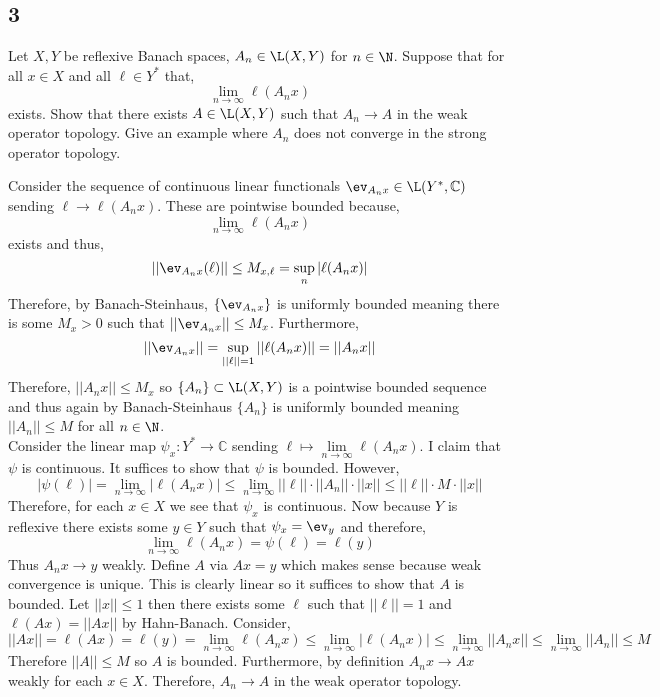 \documentclass[12pt]{article}
\renewcommand{\C}{\mathbb{C}}
\begin{document}
\subsection{3}

\begin{exercise}
Let $X, Y$ be reflexive Banach spaces, $A_n \in \L(X, Y)$ for $n \in \N$. Suppose that for all $x \in X$ and all $\ell \in Y^*$ that,
\[ \lim_{n \to \infty} \ell(A_n x) \]
exists. Show that there exists $A \in \L(X, Y)$ such that $A_n \to A$ in the weak operator topology. Give an example where $A_n$ does not converge in the strong operator topology.
\end{exercise}


Consider the sequence of continuous linear functionals $\ev_{A_n x} \in \L(Y^*, \C)$ sending $\ell \to \ell(A_n x)$. These are pointwise bounded because,
\[ \lim_{n \to \infty} \ell(A_n x) \]
exists and thus,
\[ || \ev_{A_n x} (\ell) || \le M_{x, \ell} = \sup_{n} |\ell(A_n x)| \] 
Therefore, by Banach-Steinhaus, $\{ \ev_{A_n x} \}$ is uniformly bounded meaning there is some $M_x > 0$ such that $|| \ev_{A_n x} || \le M_x$. Furthermore,
\[ || \ev_{A_n x} || = \sup_{|| \ell || = 1} || \ell(A_n x) || = || A_n x || \]
Therefore, $|| A_n x || \le M_x$ so $\{ A_n \} \subset \L(X, Y)$ is a pointwise bounded sequence and thus again by Banach-Steinhaus $\{ A_n \}$ is uniformly bounded meaning $|| A_n || \le M$ for all $n \in \N$. 
\bigskip\\
Consider the linear map $\psi_x : Y^* \to \C$ sending $\ell \mapsto \lim\limits_{n \to \infty} \ell(A_n x)$. I claim that $\psi$ is continuous. It suffices to show that $\psi$ is bounded. However,
\[ | \psi(\ell) | = \lim_{n \to \infty} | \ell(A_n x) | \le \lim_{n \to \infty} || \ell || \cdot || A_n || \cdot || x || \le || \ell || \cdot M \cdot || x || \]
Therefore, for each $x \in X$ we see that $\psi_x$ is continuous. Now because $Y$ is reflexive there exists some $y \in Y$ such that $\psi_x = \ev_{y}$ and therefore,
\[ \lim_{n \to \infty} \ell(A_n x) = \psi(\ell) = \ell(y) \]
Thus $A_n x \to y$ weakly. Define $A$ via $A x = y$ which makes sense because weak convergence is unique. This is clearly linear so it suffices to show that $A$ is bounded. Let $|| x || \le 1$ then there exists some $\ell$ such that $|| \ell || = 1$ and $\ell(A x) = || A x ||$ by Hahn-Banach. Consider,
\[ || A x ||  = \ell(A x) = \ell(y) = \lim_{n \to \infty} \ell(A_n x) \le \lim_{n \to \infty} | \ell(A_n x) | \le \lim_{n \to \infty} || A_n x || \le \lim_{n \to \infty} || A_n || \le M \]
Therefore $|| A || \le M$ so $A$ is bounded. Furthermore, by definition $A_n x \to A x$ weakly for each $x \in X$. Therefore, $A_n \to A$ in the weak operator topology.
\end{document}
